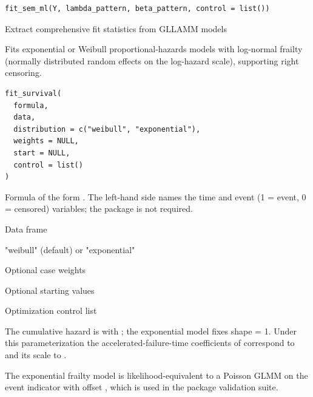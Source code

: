 \documentclass[a4paper]{book}
\begin{document}
%
\begin{Usage}
\begin{verbatim}
fit_sem_ml(Y, lambda_pattern, beta_pattern, control = list())
\end{verbatim}
\end{Usage}
%
\begin{Description}
Extract comprehensive fit statistics from GLLAMM models
\end{Description}
%
\begin{Description}
Fits exponential or Weibull proportional-hazards models with log-normal
frailty (normally distributed random effects on the log-hazard scale),
supporting right censoring.
\end{Description}
%
\begin{Usage}
\begin{verbatim}
fit_survival(
  formula,
  data,
  distribution = c("weibull", "exponential"),
  weights = NULL,
  start = NULL,
  control = list()
)
\end{verbatim}
\end{Usage}
%
\begin{Arguments}
\begin{ldescription}
\item[\code{formula}] Formula of the form .
The left-hand side names the time and event (1 = event, 0 = censored)
variables; the  package is not required.

\item[\code{data}] Data frame

\item[\code{distribution}] "weibull" (default) or "exponential"

\item[\code{weights}] Optional case weights

\item[\code{start}] Optional starting values

\item[\code{control}] Optimization control list
\end{ldescription}
\end{Arguments}
%
\begin{Details}
The cumulative hazard is  with
; the exponential model fixes
shape = 1. Under this parameterization the accelerated-failure-time
coefficients of  correspond to \eqn{-\beta}{} and
its scale to .

The exponential frailty model is likelihood-equivalent to a Poisson GLMM
on the event indicator with offset , which is used in the
package validation suite.
\end{Details}
\end{document}
